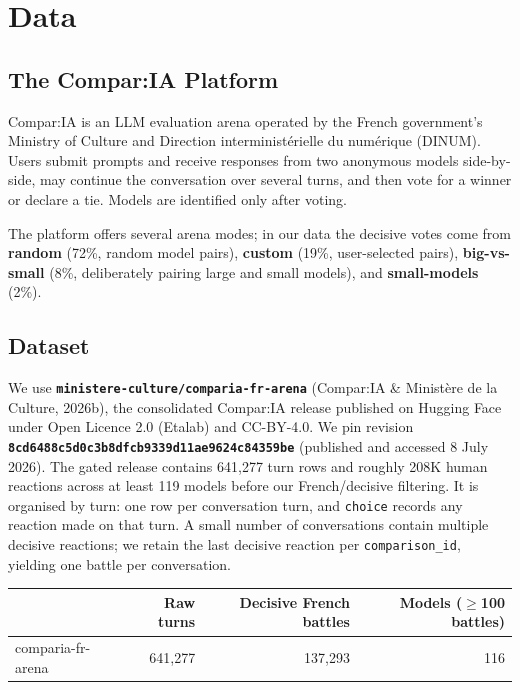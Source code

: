 \documentclass[
]{article}
\newcounter{none} %
\begin{document}
\section{Data}\label{data}

\subsection{The Compar:IA Platform}\label{the-comparia-platform}

Compar:IA is an LLM evaluation arena operated by the French government's
Ministry of Culture and Direction interministérielle du numérique
(DINUM). Users submit prompts and receive responses from two anonymous
models side-by-side, may continue the conversation over several turns,
and then vote for a winner or declare a tie. Models are identified only
after voting.

The platform offers several arena modes; in our data the decisive votes
come from \textbf{random} (72\%, random model pairs), \textbf{custom}
(19\%, user-selected pairs), \textbf{big-vs-small} (8\%, deliberately
pairing large and small models), and \textbf{small-models} (2\%).

\subsection{Dataset}\label{dataset}

We use \textbf{\texttt{ministere-culture/comparia-fr-arena}} (Compar:IA
\& Ministère de la Culture, 2026b), the consolidated Compar:IA release
published on Hugging Face under Open Licence 2.0 (Etalab) and CC-BY-4.0.
We pin revision
\textbf{\texttt{8cd6488c5d0c3b8dfcb9339d11ae9624c84359be}} (published
and accessed 8 July 2026). The gated release contains 641,277 turn rows
and roughly 208K human reactions across at least 119 models before our
French/decisive filtering. It is organised by turn: one row per
conversation turn, and \texttt{choice} records any reaction made on that
turn. A small number of conversations contain multiple decisive
reactions; we retain the last decisive reaction per
\texttt{comparison\_id}, yielding one battle per conversation.

{\def\LTcaptype{none} %
\begin{longtable}[]{@{}lrrr@{}}
\toprule\noalign{}
& Raw turns & Decisive French battles & Models (\(\geq\)100 battles) \\
\midrule\noalign{}
\endhead
\bottomrule\noalign{}
\endlastfoot
comparia-fr-arena & 641,277 & 137,293 & 116 \\
\end{longtable}
}
\end{document}

